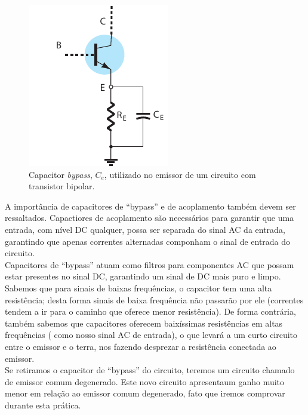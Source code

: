 \documentclass[12pt,a4paper]{article}
\begin{document}
\begin{figure}[htpb]
  \centering
  \includegraphics[width=0.35\linewidth]{./img/bypass.pdf}
  \caption{Capacitor \emph{bypass}, $C_e$, utilizado no emissor de um circuito com transistor bipolar.  }
  \label{fig:.ext}
\end{figure}

A importância de capacitores de ``bypass'' e de acoplamento também devem ser ressaltados.
Capactiores de acoplamento são necessários para garantir que uma entrada, com nível DC
qualquer, possa ser separada do sinal AC da entrada, garantindo que apenas correntes 
alternadas componham o sinal de entrada do circuito. \\
Capacitores de ``bypass'' atuam como filtros para componentes AC que possam estar 
presentes no sinal DC, garantindo um sinal de DC mais puro e limpo.
Sabemos que para sinais de baixas frequências, o capacitor 
tem uma alta resistência; desta forma sinais de baixa frequência não passarão por ele
(correntes tendem a ir para o caminho que oferece menor resistência). De forma contrária,
também sabemos que capacitores oferecem baixíssimas resistências em altas frequências (
como nosso sinal AC de entrada), o que levará a um curto circuito entre o emissor e o terra,
nos fazendo desprezar a resistência conectada ao emissor. \\
Se retiramos o capacitor de ``bypass'' do circuito, teremos um circuito 
chamado de emissor comum degenerado. Este novo circuito apresentaum ganho muito menor em
relação ao emissor comum degenerado, fato que iremos comprovar durante esta prática.
\end{document}
